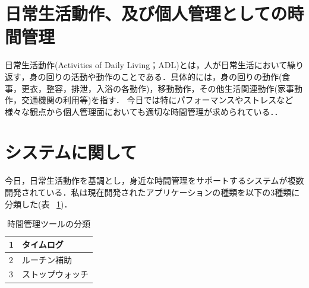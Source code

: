\section{日常生活動作、及び個人管理としての時間管理}
日常生活動作(Activities of Daily Living；ADL)とは，人が日常生活において繰り返す，身の回りの活動や動作のことである．具体的には，身の回りの動作(食事，更衣，整容，排泄，入浴の各動作)，移動動作，その他生活関連動作(家事動作，交通機関の利用等)を指す\cite{Sakai2003}．
今日では特にパフォーマンスやストレスなど様々な観点から個人管理面においても適切な時間管理が求められている．\cite{Barling1996}\cite{Britton1991}\cite{Burt1994}\cite{Macan1994}．

\section{システムに関して}
今日，日常生活動作を基調とし，身近な時間管理をサポートするシステムが複数開発されている．私は現在開発されたアプリケーションの種類を以下の3種類に分類した(表 ~\ref{tb:app})．

\begin{table}[htb]
\begin{center}
  \begin{tabular}{|l|l|} \hline
   1 & タイムログ \\ \hline
   2 & ルーチン補助 \\ \hline
   3 & ストップウォッチ \\ \hline
  \end{tabular}
  \caption{時間管理ツールの分類}
  \label{tb:app}
\end{center}
\end{table}

